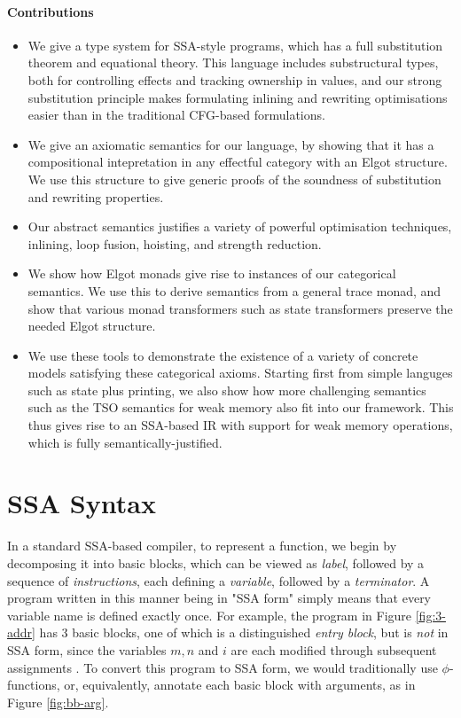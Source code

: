 \documentclass[acmsmall,screen,review]{acmart}
\begin{document}
\paragraph{Contributions} 

\begin{itemize}
\item We give a type system for SSA-style programs, which has a full
substitution theorem and equational theory. This language includes substructural
types, both for controlling effects and tracking ownership in values, and our
strong substitution principle makes formulating inlining and rewriting
optimisations easier than in the traditional CFG-based formulations. 
\item We give an axiomatic semantics for our language, by showing that it has a
compositional intepretation in any effectful category with an Elgot structure.
We use this structure to give generic proofs of the soundness of substitution
and rewriting properties.
\item Our abstract semantics justifies a variety of powerful optimisation
techniques, inlining, loop fusion, hoisting, and strength reduction. 
\item We show how Elgot monads give rise to instances of our categorical
semantics. We use this to derive semantics from a general trace monad, and show
that various monad transformers such as state transformers preserve the needed
Elgot structure. 
\item We use these tools to demonstrate the existence of a variety of concrete
models satisfying these categorical axioms. Starting first from simple languges
such as state plus printing, we also show how more challenging semantics such as
the TSO semantics for weak memory also fit into our framework. This thus gives
rise to an SSA-based IR with support for weak memory operations, which is fully
semantically-justified.
\end{itemize}

\section{SSA Syntax}

In a standard SSA-based compiler, to represent a function, we begin by
decomposing it into basic blocks, which can be viewed as \textit{label},
followed by a sequence of \textit{instructions}, each defining a
\textit{variable}, followed by a \textit{terminator}. A program written in this
manner being in "SSA form" simply means that every variable name is defined
exactly once. For example, the program in Figure \ref{fig:3-addr} has 3 basic
blocks, one of which is a distinguished \textit{entry block}, but is
\textit{not} in SSA form, since the variables \(m, n\) and \(i\) are each
modified through subsequent assignments .
To convert this program to SSA form, we would traditionally use
\(\phi\)-functions, or, equivalently, annotate each basic block with arguments,
as in Figure \ref{fig:bb-arg}.
\end{document}

